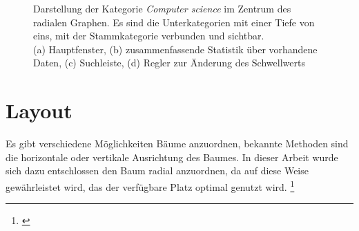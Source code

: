 \begin{figure}
    \centering
    \caption{Darstellung der Kategorie \emph{Computer science} im Zentrum des radialen Graphen.
    Es sind die Unterkategorien mit einer Tiefe von eins, mit der Stammkategorie verbunden und sichtbar.\\ (a) Hauptfenster, (b) zusammenfassende Statistik über vorhandene Daten, (c) Suchleiste, (d) Regler zur Änderung des Schwellwerts}
    \label{fig:small-start}
\end{figure}

\section{Layout}
Es gibt verschiedene Möglichkeiten Bäume anzuordnen, bekannte Methoden sind die horizontale oder vertikale Ausrichtung des Baumes.
In dieser Arbeit wurde sich dazu entschlossen den Baum radial anzuordnen, da auf diese Weise gewährleistet wird, das der verfügbare Platz optimal genutzt wird. \footnote{\cite[Kapitel 5, p.~123]{lima2014book}}


